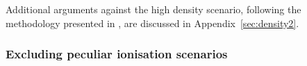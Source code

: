 \documentclass[fleqn,usenatbib]{mnras}
\newcommand{\lri}[1]{\textcolor{VioletRed}{#1}\xspace}
\newcommand{\Halpha}{\text{H\textalpha}\xspace}
\newcommand{\Hbeta}{\text{H\textbeta}\xspace}
\newcommand{\cliff}{\textit{The Cliff}\xspace}
\begin{document}


Additional arguments against the high density scenario, following the methodology presented in \cite{Maiolino2025_QSO1}, are discussed in Appendix~\ref{sec:density2}.




\subsubsection{Excluding peculiar ionisation scenarios}\label{sec:peculiar_ionisation}
\end{document}
